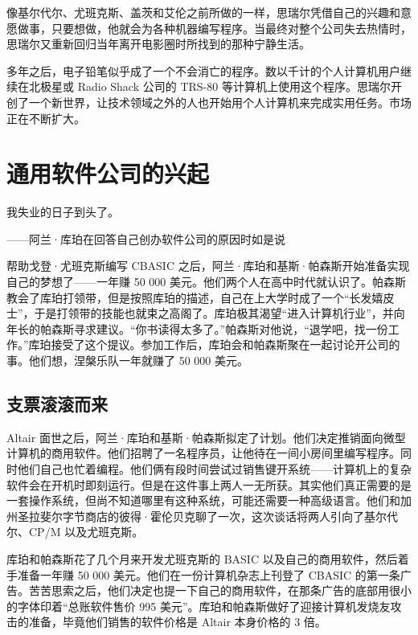 \documentclass[12pt,UTF8]{ctexbook}
\begin{document}
像基尔代尔、尤班克斯、盖茨和艾伦之前所做的一样，思瑞尔凭借自己的兴趣和意愿做事，只要想做，他就会为各种机器编写程序。当最终对整个公司失去热情时，思瑞尔又重新回归当年离开电影圈时所找到的那种宁静生活。

多年之后，电子铅笔似乎成了一个不会消亡的程序。数以千计的个人计算机用户继续在北极星或 Radio Shack 公司的 TRS-80 等计算机上使用这个程序。思瑞尔开创了一个新世界，让技术领域之外的人也开始用个人计算机来完成实用任务。市场正在不断扩大。





\section{通用软件公司的兴起}


我失业的日子到头了。

——阿兰·库珀在回答自己创办软件公司的原因时如是说



帮助戈登·尤班克斯编写 CBASIC 之后，阿兰·库珀和基斯·帕森斯开始准备实现自己的梦想了——一年赚 50 000 美元。他们两个人在高中时代就认识了。帕森斯教会了库珀打领带，但是按照库珀的描述，自己在上大学时成了一个“长发嬉皮士”，于是打领带的技能也就束之高阁了。库珀极其渴望“进入计算机行业”，并向年长的帕森斯寻求建议。“你书读得太多了。”帕森斯对他说，“退学吧，找一份工作。”库珀接受了这个提议。参加工作后，库珀会和帕森斯聚在一起讨论开公司的事。他们想，涅槃乐队一年就赚了 50 000 美元。





\subsection{支票滚滚而来}


Altair 面世之后，阿兰·库珀和基斯·帕森斯拟定了计划。他们决定推销面向微型计算机的商用软件。他们招聘了一名程序员，让他待在一间小房间里编写程序。同时他们自己也忙着编程。他们俩有段时间尝试过销售键开系统——计算机上的复杂软件会在开机时即刻运行。但是在这件事上两人一无所获。其实他们真正需要的是一套操作系统，但尚不知道哪里有这种系统，可能还需要一种高级语言。他们和加州圣拉斐尔字节商店的彼得·霍伦贝克聊了一次，这次谈话将两人引向了基尔代尔、CP/M 以及尤班克斯。

库珀和帕森斯花了几个月来开发尤班克斯的 BASIC 以及自己的商用软件，然后着手准备一年赚 50 000 美元。他们在一份计算机杂志上刊登了 CBASIC 的第一条广告。苦苦思索之后，他们决定也提一下自己的商用软件，在那条广告的底部用很小的字体印着“总账软件售价 995 美元”。库珀和帕森斯做好了迎接计算机发烧友攻击的准备，毕竟他们销售的软件价格是 Altair 本身价格的 3 倍。
\end{document}

